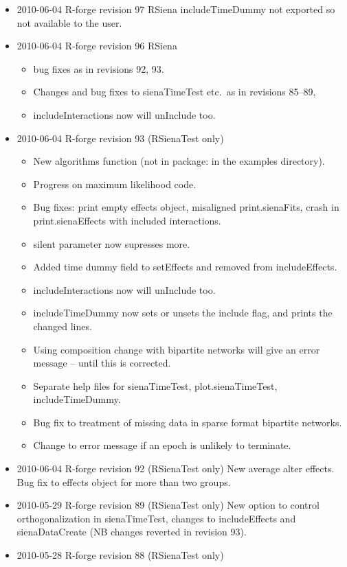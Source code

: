 \documentclass[a4paper,fleqn,11pt]{article}
\newcommand{\+}{\, + \,}
\newcommand{\sfn}[1]{\textsf{#1}}
\begin{document}
{\begin{small}
\begin{itemize}
\item 2010-06-04 R-forge revision 97 RSiena includeTimeDummy not exported so not
  available to the user.
\item 2010-06-04 R-forge revision 96 RSiena
\begin{itemize}
\item bug fixes as in revisions 92, 93.
\item Changes and bug fixes to sienaTimeTest etc.\ as in revisions 85--89,
\item \sfn{includeInteractions} now will unInclude too.
\end{itemize}
\item 2010-06-04 R-forge revision 93 (RSienaTest only)
\begin{itemize}\item New algorithms function
  (not in package: in the examples directory).
\item Progress on maximum likelihood code.
\item Bug fixes: print empty effects object, misaligned print.sienaFits, crash
  in print.sienaEffects with included interactions.
\item silent parameter now supresses more.
\item Added time dummy field to \sfn{setEffects} and removed from
\sfn{includeEffects}.
\item \sfn{includeInteractions} now will unInclude too.
\item \sfn{includeTimeDummy} now sets or unsets the include flag, and prints the
  changed lines.
\item Using composition change with bipartite networks will give an error
  message -- until this is corrected.
\item Separate help files for sienaTimeTest, plot.sienaTimeTest,
  includeTimeDummy.
\item Bug fix to treatment of missing data in sparse format bipartite networks.
\item Change to error message if an epoch is unlikely to terminate.
\end{itemize}
\item 2010-06-04 R-forge revision 92 (RSienaTest only) New average alter
  effects. Bug fix to effects object for more than two groups.
\item 2010-05-29 R-forge revision 89 (RSienaTest only)
New option to control orthogonalization in sienaTimeTest, changes to
includeEffects and sienaDataCreate (NB changes reverted in revision 93).
\item 2010-05-28 R-forge revision 88 (RSienaTest only)

\end{itemize}
\end{small}}
\end{document}
